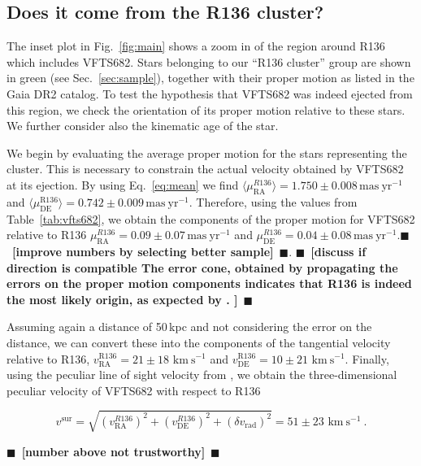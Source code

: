 \documentclass{aa}
\newcommand{\todo}[1]{{\large $\blacksquare$~\textbf{\color{red}[#1]}}~$\blacksquare$}
\newcommand{\kms}{{\,\mathrm{km\ s^{-1}}}}
\DeclareRobustCommand{\Eqref}[1]{Eq.~\ref{#1}}
\DeclareRobustCommand{\Figref}[1]{Fig.~\ref{#1}}
\DeclareRobustCommand{\Tabref}[1]{Table~\ref{#1}}
\DeclareRobustCommand{\Secref}[1]{Sec.~\ref{#1}}
\begin{document}
\subsection{Does it come from the R136 cluster?}
\label{sec:r136_origin}

The inset plot in \Figref{fig:main} shows a zoom in of the region
around R136 which includes VFTS682. Stars belonging to our ``R136
cluster'' group are shown in green (see \Secref{sec:sample}), together with their proper motion
as listed in the Gaia DR2 catalog.
To test the hypothesis that VFTS682 was indeed ejected from this region, we check the
orientation of its proper motion relative to these stars. We further
consider also the kinematic age of the star.

We begin by evaluating the average proper motion for the stars
representing the cluster. This is necessary to constrain the actual velocity
obtained by VFTS682 at its ejection. By using \Eqref{eq:mean} we find  
$\langle\mu_\mathrm{RA}^{R136}\rangle = 1.750\pm0.008\,\mathrm{mas\ yr^{-1}}$
and $\langle\mu_\mathrm{DE}^\mathrm{R136}\rangle =
0.742\pm0.009\,\mathrm{mas\ yr^{-1}}$. Therefore, using the values
from \Tabref{tab:vfts682}, we obtain the components of the proper
motion for VFTS682 relative to R136 $\mu^{R136}_\mathrm{RA} = 0.09\pm 0.07\,\mathrm{mas\ yr^{-1}}$ and $\mu^{R136}_\mathrm{DE} =
0.04\pm 0.08\,\mathrm{mas\ yr^{-1}}$.\todo{improve numbers by
  selecting better sample}.
\todo{discuss if direction is compatible
The error cone, obtained by
propagating the errors on the proper motion components indicates that
R136 is indeed the most likely origin, as expected by \cite{fujii:11,
  banerjee:12}.
}

Assuming again a distance of 50\,kpc and
not considering the error on the distance, we can convert these into
the components of the tangential velocity relative to R136,
$v^\mathrm{R136}_\mathrm{RA}=21 \pm 18\, \kms$ and $v^\mathrm{R136}_\mathrm{DE}=10
\pm 21\,\kms$. Finally, using the peculiar line of sight velocity
from \cite{bestenlehner:11}, we obtain the three-dimensional peculiar
velocity of VFTS682 with respect to R136

\begin{equation}
  \label{eq:speed_R136}
  v^\mathrm{sur} = \sqrt{\left(v^{R136}_\mathrm{RA}\right)^2
    +\left(v^{R136}_\mathrm{DE}\right)^2+\left(\delta v_\mathrm{rad}\right)^2} = 51 \pm 23
  \, \kms \ .
\end{equation}

\todo{number above not trustworthy}
\end{document}
